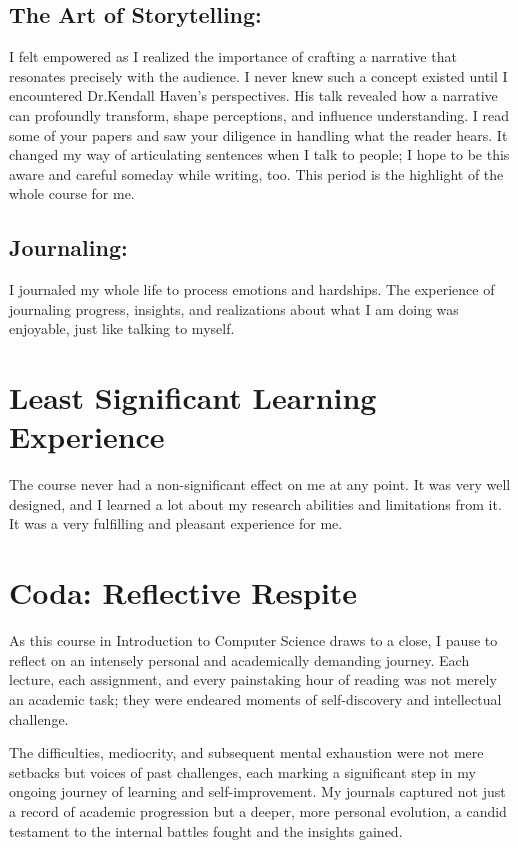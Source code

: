 \documentclass[10pt]{article}
\begin{document}
\subsection*{The Art of Storytelling: }
I felt empowered as I realized the importance of crafting a narrative that resonates precisely with the audience. I never knew such a concept existed until I encountered Dr.Kendall Haven's perspectives. His talk revealed how a narrative can profoundly transform, shape perceptions, and influence understanding. I read some of your papers and saw your diligence in handling what the reader hears. It changed my way of articulating sentences when I talk to people; I hope to be this aware and careful someday while writing, too. This period is the highlight of the whole course for me.

\subsection*{Journaling:}
I journaled my whole life to process emotions and hardships. The experience of journaling progress, insights, and realizations about what I am doing was enjoyable, just like talking to myself.

\section{Least Significant Learning Experience}
The course never had a non-significant effect on me at any point. It was very well designed, and I learned a lot about my research abilities and limitations from it. It was a very fulfilling and pleasant experience for me.

\section{Coda: Reflective Respite}
As this course in Introduction to Computer Science draws to a close, I pause to reflect on an intensely personal and academically demanding journey. Each lecture, each assignment, and every painstaking hour of reading was not merely an academic task; they were endeared moments of self-discovery and intellectual challenge.

The difficulties, mediocrity, and subsequent mental exhaustion were not mere setbacks but voices of past challenges, each marking a significant step in my ongoing journey of learning and self-improvement. My journals captured not just a record of academic progression but a deeper, more personal evolution, a candid testament to the internal battles fought and the insights gained.
\end{document}
